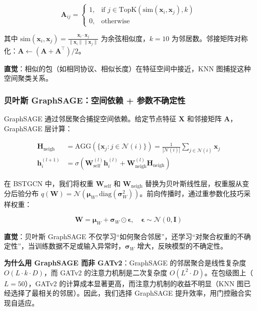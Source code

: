 \begin{equation}
\mathbf{A}_{ij} = \begin{cases}
1, & \text{if } j \in \text{TopK}(\text{sim}(\mathbf{x}_i, \mathbf{x}_j), k) \\
0, & \text{otherwise}
\end{cases}
\end{equation}

其中 $\text{sim}(\mathbf{x}_i, \mathbf{x}_j) = \frac{\mathbf{x}_i \cdot \mathbf{x}_j}{\|\mathbf{x}_i\| \|\mathbf{x}_j\|}$ 为余弦相似度，$k=10$ 为邻居数。邻接矩阵对称化：$\mathbf{A} \leftarrow (\mathbf{A} + \mathbf{A}^\top) / 2$。

\textbf{直觉}：相似的包（如相同协议、相似长度）在特征空间中接近，KNN 图捕捉这种空间聚类关系。

\subsubsection{贝叶斯 GraphSAGE：空间依赖 + 参数不确定性}

GraphSAGE 通过邻居聚合捕捉空间依赖。给定节点特征 $\mathbf{X}$ 和邻接矩阵 $\mathbf{A}$，GraphSAGE 层计算：

\begin{align}
\mathbf{H}_{\text{neigh}} &= \text{AGG}(\{\mathbf{x}_j : j \in \mathcal{N}(i)\}) = \frac{1}{|\mathcal{N}(i)|} \sum_{j \in \mathcal{N}(i)} \mathbf{x}_j \\
\mathbf{h}_i^{(l+1)} &= \sigma\left( \mathbf{W}_{\text{self}}^{(l)} \mathbf{h}_i^{(l)} + \mathbf{W}_{\text{neigh}}^{(l)} \mathbf{H}_{\text{neigh}} \right)
\end{align}

在 BSTGCN 中，我们将权重 $\mathbf{W}_{\text{self}}$ 和 $\mathbf{W}_{\text{neigh}}$ 替换为贝叶斯线性层，权重服从变分后验分布 $q(\mathbf{W}) = \mathcal{N}(\boldsymbol{\mu}_W, \text{diag}(\boldsymbol{\sigma}_W^2))$。前向传播时，通过重参数化技巧采样权重：

\begin{equation}
\mathbf{W} = \boldsymbol{\mu}_W + \boldsymbol{\sigma}_W \odot \boldsymbol{\epsilon}, \quad \boldsymbol{\epsilon} \sim \mathcal{N}(0, \mathbf{I})
\end{equation}

\textbf{直觉}：贝叶斯 GraphSAGE 不仅学习``如何聚合邻居''，还学习``对聚合权重的不确定性''，当训练数据不足或输入异常时，$\boldsymbol{\sigma}_W$ 增大，反映模型的不确定性。

\textbf{为什么用 GraphSAGE 而非 GATv2}：GraphSAGE 的邻居聚合是线性复杂度 $O(L \cdot k \cdot D)$，而 GATv2 的注意力机制是二次复杂度 $O(L^2 \cdot D)$。在包级图上（$L=50$），GATv2 的计算成本显著更高，而注意力机制的收益不明显（KNN 图已经选择了最相关的邻居）。因此，我们选择 GraphSAGE 提升效率，用门控融合实现自适应。

